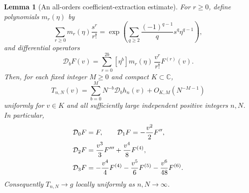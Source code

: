 \documentclass[11pt]{article}
\numberwithin{equation}{section}
\newtheorem{lemma}[theorem]{Lemma}
\theoremstyle{definition}
\theoremstyle{remark}
\begin{document}
\begin{lemma}[An all-orders coefficient-extraction estimate]
\label{lem:reciprocal-saddle}
For $r\geq0$, define polynomials $m_r(\eta)$ by
\begin{equation}\label{eq:saddle-moment-generating-function}
 \sum_{r\geq0}m_r(\eta)\frac{s^r}{r!}
  =\exp\left(\sum_{q\geq2}
        \frac{(-1)^{q-1}}q s^q\eta^{q-1}\right),
\end{equation}
and differential operators
\begin{equation}\label{eq:saddle-operator-definition}
 \mathcal D_b F(v)=\sum_{r=0}^{2b}
       [\eta^b]m_r(\eta)\,\frac{v^r}{r!}F^{(r)}(v).
\end{equation}
Then, for each fixed integer $M\geq0$ and compact $K\subset\mathbb C$,
\begin{equation}\label{eq:log-free-saddle-expansion}
 T_{n,N}(v)=\sum_{b=0}^{M}N^{-b}\mathcal D_bh_n(v)
             +O_{K,M}(N^{-M-1})
\end{equation}
uniformly for $v\in K$ and all sufficiently large independent
positive integers $n,N$.  In particular,
\begin{align}\label{eq:first-saddle-operators}
 \mathcal D_0F&=F,\qquad
 \mathcal D_1F=-\frac{v^2}{2}F'',\\
 \mathcal D_2F&=\frac{v^3}{3}F'''+\frac{v^4}{8}F^{(4)},\notag\\
 \mathcal D_3F&=-\frac{v^4}{4}F^{(4)}
                 -\frac{v^5}{6}F^{(5)}
                 -\frac{v^6}{48}F^{(6)}.\notag
\end{align}
Consequently $T_{n,N}\to g$ locally uniformly as $n,N\to\infty$.
\end{lemma}
\end{document}
